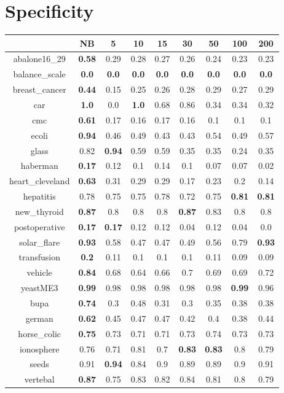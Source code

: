 \documentclass{article}%
\begin{document}
%
\section*{Specificity}%
\begin{tabular}{c|cccccccc}%
\hline%
&NB&5&10&15&30&50&100&200\\%
\hline%
abalone16\_29&\textbf{0.58}&0.29&0.28&0.27&0.26&0.24&0.23&0.23\\%
\hline%
balance\_scale&\textbf{0.0}&\textbf{0.0}&\textbf{0.0}&\textbf{0.0}&\textbf{0.0}&\textbf{0.0}&\textbf{0.0}&\textbf{0.0}\\%
\hline%
breast\_cancer&\textbf{0.44}&0.15&0.25&0.26&0.28&0.29&0.27&0.29\\%
\hline%
car&\textbf{1.0}&0.0&\textbf{1.0}&0.68&0.86&0.34&0.34&0.32\\%
\hline%
cmc&\textbf{0.61}&0.17&0.16&0.17&0.16&0.1&0.1&0.1\\%
\hline%
ecoli&\textbf{0.94}&0.46&0.49&0.43&0.43&0.54&0.49&0.57\\%
\hline%
glass&0.82&\textbf{0.94}&0.59&0.59&0.35&0.35&0.24&0.35\\%
\hline%
haberman&\textbf{0.17}&0.12&0.1&0.14&0.1&0.07&0.07&0.02\\%
\hline%
heart\_cleveland&\textbf{0.63}&0.31&0.29&0.29&0.17&0.23&0.2&0.14\\%
\hline%
hepatitis&0.78&0.75&0.75&0.78&0.72&0.75&\textbf{0.81}&\textbf{0.81}\\%
\hline%
new\_thyroid&\textbf{0.87}&0.8&0.8&0.8&\textbf{0.87}&0.83&0.8&0.8\\%
\hline%
postoperative&\textbf{0.17}&\textbf{0.17}&0.12&0.12&0.04&0.12&0.04&0.0\\%
\hline%
solar\_flare&\textbf{0.93}&0.58&0.47&0.47&0.49&0.56&0.79&\textbf{0.93}\\%
\hline%
transfusion&\textbf{0.2}&0.11&0.1&0.1&0.1&0.11&0.09&0.09\\%
\hline%
vehicle&\textbf{0.84}&0.68&0.64&0.66&0.7&0.69&0.69&0.72\\%
\hline%
yeastME3&\textbf{0.99}&0.98&0.98&0.98&0.98&0.98&\textbf{0.99}&0.96\\%
\hline%
bupa&\textbf{0.74}&0.3&0.48&0.31&0.3&0.35&0.38&0.38\\%
\hline%
german&\textbf{0.62}&0.45&0.47&0.47&0.42&0.4&0.38&0.44\\%
\hline%
horse\_colic&\textbf{0.75}&0.73&0.71&0.71&0.73&0.74&0.73&0.73\\%
\hline%
ionosphere&0.76&0.71&0.81&0.7&\textbf{0.83}&\textbf{0.83}&0.8&0.79\\%
\hline%
seeds&0.91&\textbf{0.94}&0.84&0.9&0.89&0.89&0.9&0.91\\%
\hline%
vertebal&\textbf{0.87}&0.75&0.83&0.82&0.84&0.81&0.8&0.79\\%
\hline%
\end{tabular}
\end{document}

